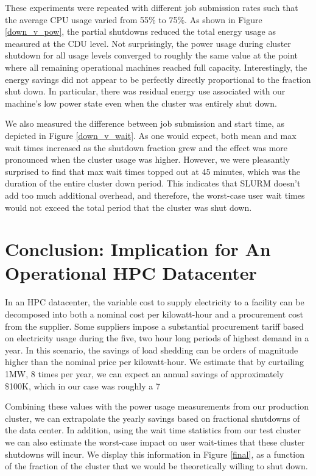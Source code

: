 These experiments were repeated with different job submission rates such that the average CPU usage varied from 55\% to 75\%.  As shown in Figure \ref{down_v_pow}, the partial shutdowns reduced the total energy usage as measured at the CDU level.  Not surprisingly, the power usage during cluster shutdown for all usage levels converged to roughly the same value at the point where all remaining operational machines reached full capacity. Interestingly, the energy savings did not appear to be perfectly directly proportional to the fraction shut down.  In particular, there was residual energy use associated with our machine's low power state even when the cluster was entirely shut down.   

We also measured the difference between job submission and start time, as depicted in Figure \ref{down_v_wait}.  As one would expect, both mean and max wait times increased as the shutdown fraction grew and the effect was more pronounced when the cluster usage was higher.  However, we were pleasantly surprised to find that max wait times topped out at 45 minutes, which was the duration of the entire cluster down period.  This indicates that SLURM doesn't add too much additional overhead, and therefore, the worst-case user wait times would not exceed the total period that the cluster was shut down.

\section{Conclusion: Implication for An Operational HPC Datacenter}


In an HPC datacenter, the variable cost to supply electricity to a facility can be decomposed into both a nominal cost per kilowatt-hour and a procurement cost from the supplier.  Some suppliers impose a substantial procurement tariff based on electricity usage during the five, two hour long periods of highest demand in a year.  In this scenario, the savings of load shedding can be orders of magnitude higher than the nominal price per kilowatt-hour.  We estimate that by curtailing 1MW, 8 times per year, we can expect an annual savings of approximately \$100K, which in our case was roughly a 7%



Combining these values with the power usage measurements from our production cluster, we can extrapolate the yearly savings based on fractional shutdowns of the data center.  In addition, using the wait time statistics from our test cluster we can also estimate the worst-case impact on user wait-times that these cluster shutdowns will incur.  We display this information in Figure \ref{final}, as a function of the fraction of the cluster that we would be theoretically willing to shut down.

